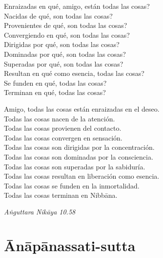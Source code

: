 \clearpage

\begin{english}
  Enraizadas en qué, amigo, están todas las cosas?\\
  Nacidas de qué, son todas las cosas?\\
  Provenientes de qué, son todas las cosas?\\
  Convergiendo en qué, son todas las cosas?\\
  Dirigidas por qué, son todas las cosas?\\
  Dominadas por qué, son todas las cosas?\\
  Superadas por qué, son todas las cosas?\\
  Resultan en qué como esencia, todas las cosas?\\
  Se funden en qué, todas las cosas?\\
  Terminan en qué, todas las cosas?

  \bigskip

  Amigo, todas las cosas están enraizadas en el deseo.\\
  Todas las cosas nacen de la atención.\\
  Todas las cosas provienen del contacto.\\
  Todas las cosas convergen en sensación.\\
  Todas las cosas son dirigidas por la concentración.\\
  Todas las cosas son dominadas por la consciencia.\\
  Todas las cosas son superadas por la sabiduría.\\
  Todas las cosas resultan en liberación como esencia.\\
  Todas las cosas se funden en la inmortalidad.\\
  Todas las cosas terminan en Nibbāna.

\end{english}

{\raggedleft
  \emph{Aṅguttara Nikāya 10.58}
\par}

\chapter{Ānāpānassati-sutta}


\begin{leader}
\end{leader}

